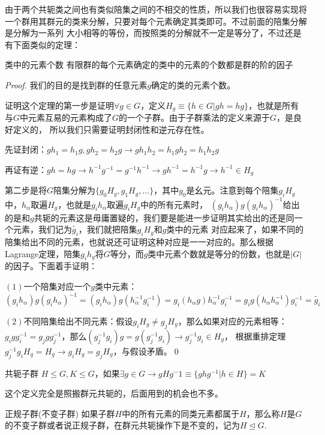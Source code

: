 由于两个共轭类之间也有类似陪集之间的不相交的性质，所以我们也很容易实现将一个群用其群元的类来分解，只要对每个元素确定其类即可。不过前面的陪集分解是分解为一系列
大小相等的等份，而按照类的分解就不一定是等分了，不过还是有下面类似的定理：
\begin{theorem}{类中的元素个数}
    有限群的每个元素确定的类中的元素的个数都是群的阶的因子
\end{theorem}
\begin{proof}
    我们的目的是找到群的任意元素$g$确定的类的元素个数。

    证明这个定理的第一步是证明$\forall g\in G$，定义$H_g\equiv\{h\in G|gh=hg\}$，也就是所有与$G$中元素互易的元素构成了$G$的一个子群。由于子群乘法的定义来源于$G$，是良好定义的，
    所以我们只需要证明封闭性和逆元存在性。

    先证封闭：$gh_1=h_1g,gh_2=h_2g\rightarrow gh_1h_2=h_1gh_2=h_1h_2g$

    再证有逆：$gh=hg\rightarrow h^{-1}g^{-1}=g^{-1}h^{-1}\rightarrow gh^{-1}=h^{-1}g\rightarrow h^{-1}\in H_g$

    第二步是将$G$陪集分解为$\{g_0H_g,g_1H_g,\ldots\}$，其中$g_0$是幺元。注意到每个陪集$g_iH_g$中，$h_\alpha$取遍$H_g$，也就是$g_i h_\alpha$取遍$g_iH_g$中的所有元素时，
    $(g_i h_\alpha )g(g_i h_\alpha )^{-1}$给出的是和$g$共轭的元素这是毋庸置疑的，我们要是能进一步证明其实给出的还是同一个元素，我们记为$\tilde{g_i}$，我们就把陪集$g_iH_g$和$g$类中的元素
    对应起来了，如果不同的陪集给出不同的元素，也就说还可证明这种对应是一一对应的。那么根据Lagrange定理，陪集$g_ih_g$将$G$等分，而$g$类中元素个数就是等分的份数，也就是$|G|$的因子。下面着手证明：

    $(1)$一个陪集对应一个$g$类中元素：$(g_i h_\alpha )g(g_i h_\alpha )^{-1}=(g_i h_\alpha )g( h_\alpha^{-1}g_i^{-1} )=g_i (h_\alpha g) h_\alpha^{-1}g_i^{-1}
    =g_i  g(h_\alpha h_\alpha^{-1})g_i^{-1} =\tilde{g_i}$
    
    $(2)$不同陪集给出不同元素：假设$g_iH_g\neq g_j H_g$，那么如果对应的元素相等：$g_igg_i^{-1}=g_jgg_j^{-1}$，那么$(g_j^{-1}g_i)g=g(g_j^{-1}g_i)\rightarrow g_j^{-1}g_i\in H_g$，
    根据重排定理$g_j^{-1}g_iH_g=H_g\rightarrow g_iH_g=g_jH_g$，与假设矛盾。\qed
\end{proof}
\begin{define}{共轭子群}
    $H\leq G,K\leq G$，如果$\exists g\in G\rightarrow gHg^-1\equiv\{ghg^{-1}|h\in H\}=K$
\end{define}
这个定义完全是照搬群元共轭的，后面用到的机会也不多。
\begin{define}{正规子群(不变子群)}
    如果子群$H$中的所有元素的同类元素都属于$H$，那么称$H$是$G$的不变子群或者说正规子群，在群元共轭操作下是不变的，记为$H\unlhd G$.
\end{define}

